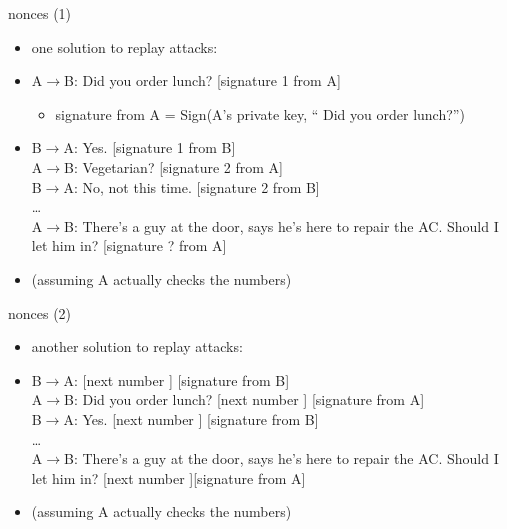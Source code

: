 \begin{frame}{nonces (1)}
    \begin{itemize}
    \item one solution to replay attacks:
    \item A$\rightarrow$B:  Did you order lunch? [signature 1 from A] 
        \begin{itemize}
        \item signature from A = Sign(A's private key, `` Did you order lunch?'')
        \end{itemize}
    \item B$\rightarrow$A:  Yes. [signature 1 from B] \\
    A$\rightarrow$B:  Vegetarian? [signature 2 from A] \\
    B$\rightarrow$A:  No, not this time. [signature 2 from B] \\
    \ldots \\
    A$\rightarrow$B:  There's a guy at the door, says he's here to repair the AC. Should I let him in? [signature ? from A] \\
    \vspace{.5cm}
    \item (assuming A actually checks the numbers)
    \end{itemize}
\end{frame}

\begin{frame}{nonces (2)}
    \begin{itemize}
    \item another solution to replay attacks:
    \item B$\rightarrow$A: [next number ] [signature from B] \\
    A$\rightarrow$B:  Did you order lunch? [next number ] [signature from A] \\
    B$\rightarrow$A:  Yes. [next number ] [signature from B] \\
    \ldots \\
    A$\rightarrow$B:  There's a guy at the door, says he's here to repair the AC. Should I let him in? [next number ][signature from A] 
    \vspace{.5cm}
    \item (assuming A actually checks the numbers)
    \end{itemize}
\end{frame}
